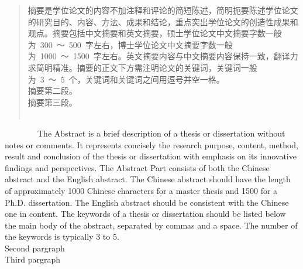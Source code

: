\begin{abstract}
\setlength\parindent{2em}
摘要是学位论文的内容不加注释和评论的简短陈述，简明扼要陈述学位论文的研究目的、内容、方法、成果和结论，重点突出学位论文的创造性成果和观点。摘要包括中文摘要和英文摘要，硕士学位论文中文摘要字数一般为~300~～~500~字左右，博士学位论文中文摘要字数一般为~1000~～~1500~字左右。英文摘要内容与中文摘要内容保持一致，翻译力求简明精准。摘要的正文下方需注明论文的关键词，关键词一般为~3~～~5~个，关键词和关键词之间用逗号并空一格。\\
\indent 摘要第二段。\\
\indent 摘要第三段。\\
 \\
\end{abstract}

\begin{englishabstract}
    \setlength\parindent{2em}
    ~~~~~~~~The Abstract is a brief description of a thesis or dissertation without notes or comments. It represents concisely the research purpose, content, method, result and conclusion of the thesis or dissertation with emphasis on its innovative findings and perspectives. The Abstract Part consists of both the Chinese abstract and the English abstract. The Chinese abstract should have the length of approximately 1000 Chinese characters for a master thesis and 1500 for a Ph.D. dissertation. The English abstract should be consistent with the Chinese one in content. The keywords of a thesis or dissertation should be listed below the main body of the abstract, separated by commas and a space. The number of the keywords is typically 3 to 5.\\
    \indent Second pargraph\\
    \indent Third pargraph\\
 \\

\end{englishabstract}


